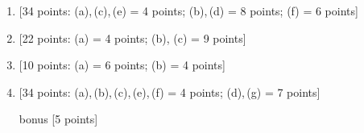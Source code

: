 \documentclass[11pt]{article}
\begin{document}
\newpage
\setcounter{page}{1}
\begin{enumerate}
\newpage\vspace*{0em}
\item {[34 points: (a),\,(c),\,(e) = 4 points; (b),\,(d) = 8 points; (f) = 6 points]}



\newpage\vspace*{0em}
\item {[22 points: (a) = 4 points; (b), (c) = 9 points]}



\newpage\vspace*{0em}
\item {[10 points: (a) = 6 points; (b) = 4 points]}



\newpage\vspace*{0em}
\item {[34 points: (a),\,(b),\,(c),\,(e),\,(f) = 4 points; (d),\,(g) = 7 points]}




\newpage\vspace*{0em}
\item[bonus] {[5 points]}



\end{enumerate}
\end{document}
